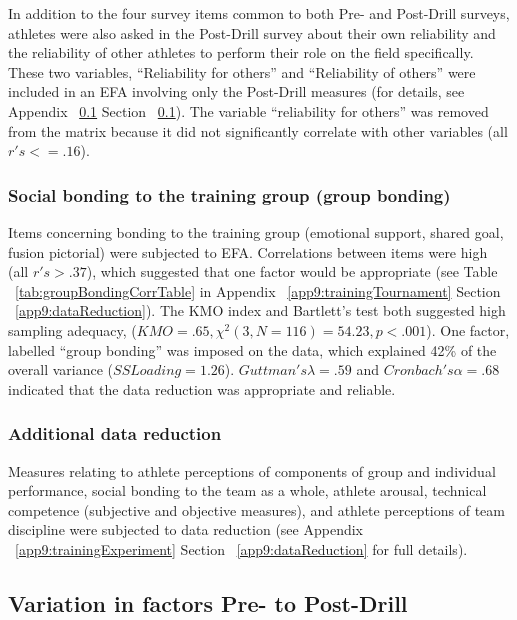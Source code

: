 In addition to the four survey items common to both Pre- and Post-Drill surveys, athletes were also asked in the Post-Drill survey about their own reliability and the reliability of other athletes to perform their role on the field specifically. These two variables, ``Reliability for others'' and ``Reliability of others'' were included in an EFA involving only the Post-Drill measures (for details, see Appendix ~\ref{} Section ~\ref{}).  The variable ``reliability for others'' was removed from the matrix because it did not significantly correlate with other variables (all $r's <= .16$).


\subsubsection{Social bonding to the training group (group bonding)}
Items concerning bonding to the training group (emotional support, shared goal, fusion pictorial) were subjected to EFA.  Correlations between items were high (all $r's > .37$), which suggested that one factor would be appropriate (see Table ~\ref{tab:groupBondingCorrTable} in Appendix ~\ref{app9:trainingTournament} Section ~\ref{app9:dataReduction}). The KMO index and Bartlett's test both suggested high sampling adequacy, ($KMO =  .65, \chi^2(3, N = 116) = 54.23, p < .001$).
One factor, labelled ``group bonding'' was imposed on the data, which explained 42\% of the overall variance ($SS Loading = 1.26$). $Guttman's \lambda = .59$ and $Cronbach's \alpha = .68$ indicated that the data reduction was appropriate and reliable.

\subsubsection{Additional data reduction}
Measures relating to athlete perceptions of components of group and individual performance, social bonding to the team as a whole, athlete arousal, technical competence (subjective and objective measures), and athlete perceptions of team discipline were subjected to data reduction (see Appendix ~\ref{app9:trainingExperiment} Section ~\ref{app9:dataReduction} for full details).






\subsection{Variation in factors Pre- to Post-Drill}



